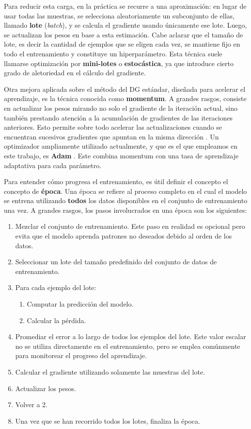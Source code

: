 \documentclass[../../main.tex]{subfiles}
\begin{document}
Para reducir esta carga, en la práctica se recurre a una aproximación: en lugar de usar
todas las muestras, se selecciona aleatoriamente un subconjunto de ellas, llamado
\textbf{lote} (\textit{batch}), y se calcula el gradiente usando únicamente ese lote.
Luego, se actualizan los pesos en base a esta estimación. Cabe aclarar que el tamaño de
lote, es decir la cantidad de ejemplos que se eligen cada vez, se mantiene fijo en todo el
entrenamiento y constituye un hiperparámetro. Esta técnica suele llamarse optimización por
\textbf{mini-lotes} o \textbf{estocástica}, ya que introduce cierto grado de aletoriedad
en el cálculo del gradiente.

Otra mejora aplicada sobre el método del DG estándar, diseñada para acelerar el
aprendizaje, es la técnica conocida como \textbf{momentum}. A grandes rasgos, consiste en
actualizar los pesos mirando no solo el gradiente de la iteración actual, sino también
prestando atención a la acumulación de gradientes de las iteraciones anteriores. Esto
permite sobre todo acelerar las actualizaciones cuando se encuentran sucesivos gradientes
que apuntan en la misma dirección \cite{deep-learning}. Un optimizador ampliamente
utilizado actualmente, y que es el que empleamos en este trabajo, es \textbf{Adam}
\cite{adampaper}. Este combina momentum con una tasa de aprendizaje adaptativa para cada
parámetro.

Para entender cómo progresa el entrenamiento, es útil definir el concepto el concepto de
\textbf{época}. Una época se refiere al proceso completo en el cual el modelo se entrena
utilizando \textbf{todos} los datos disponibles en el conjunto de entrenamiento una vez. A
grandes rasgos, los pasos involucrados en una época son los siguientes:
\begin{enumerate}[itemsep=0.05cm,label=\textbf{\arabic*.}]
    \item Mezclar el conjunto de entrenamiento. Este paso en realidad es opcional
    pero evita que el modelo aprenda patrones no deseados debido al orden de los datos.
    \item Seleccionar un lote del tamaño predefinido del conjunto de datos de entrenamiento.
    \item Para cada ejemplo del lote:
    \vspace{-0.2cm}
    \begin{enumerate}[noitemsep]
        \item Computar la predicción del modelo.
        \item Calcular la pérdida.
    \end{enumerate}
    \item Promediar el error a lo largo de todos los ejemplos del lote. Este valor escalar
    no se utiliza directamente en el entrenamiento, pero se emplea comúnmente para
    monitorear el progreso del aprendizaje.
    \item Calcular el gradiente utilizando solamente las muestras del lote.
    \item Actualizar los pesos.
    \item Volver a 2.
    \item Una vez que se han recorrido todos los lotes, finaliza la época.
\end{enumerate}
\end{document}
